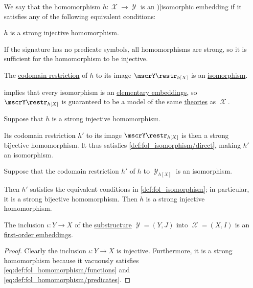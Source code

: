\begin{definition}\label{def:fol_embedding}
  We say that the homomorphism \( h: \mscrX \to \mscrY \) is an \term[en=embedding (\cite[def. 2.3.26(ii)]{Hinman2005Logic})]{isomorphic embedding} if it satisfies any of the following equivalent conditions:
  \begin{thmenum}
     \( h \) is a strong injective homomorphism.

    If the signature has no predicate symbols, all homomorphisms are strong, so it is sufficient for the homomorphism to be injective.

     The \hyperref[def:set_valued_function/restriction]{codomain restriction} of \( h \) to its image \( \mscrY\restr_{h[X]} \) is an \hyperref[def:fol_isomorphism]{isomorphism}.
  \end{thmenum}
\end{definition}
\begin{comments}
  \item {} implies that every isomorphism is an \hyperref[def:elementary_embedding]{elementary embeddings}, so \( \mscrY\restr_{h[X]} \) is guaranteed to be a model of the same \hyperref[def:fol_theory]{theories} as \( \mscrX \).
\end{comments}
\begin{defproof}
   Suppose that \( h \) is a strong injective homomorphism.

  Its codomain restriction \( h' \) to its image \( \mscrY\restr_{h[X]} \) is then a strong bijective homomorphism. It thus satisfies \cref{def:fol_isomorphism/direct}, making \( h' \) an isomorphism.

   Suppose that the codomain restriction \( h' \) of \( h \) to \( \mscrY_{h[X]} \) is an isomorphism.

  Then \( h' \) satisfies the equivalent conditions in \cref{def:fol_isomorphism}; in particular, it is a strong bijective homomorphism. Then \( h \) is a strong injective homomorphism.
\end{defproof}

\begin{proposition}\label{thm:fol_inclusion_is_embedding}
  The inclusion \( \iota: Y \to X \) of the \hyperref[def:fol_substructure]{substructure} \( \mscrY = (Y, J) \) into \( \mscrX = (X, I) \) is an \hyperref[def:fol_embedding]{first-order embeddings}.
\end{proposition}
\begin{proof}
  Clearly the inclusion \( \iota: Y \to X \) is injective. Furthermore, it is a strong homomorphism because it vacuously satisfies \eqref{eq:def:fol_homomorphism/functions} and \eqref{eq:def:fol_homomorphism/predicates}.
\end{proof}


